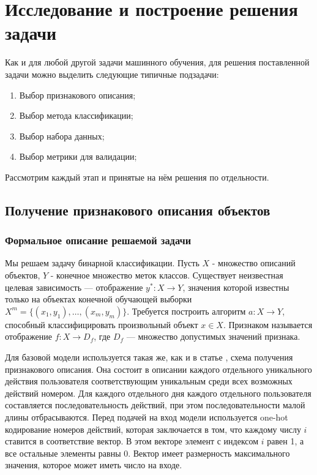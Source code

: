 \chapter{Исследование и построение решения задачи}

Как и для любой другой задачи машинного обучения, для решения поставленной задачи можно выделить следующие типичные подзадачи:\\

\begin{enumerate}
\item Выбор признакового описания; \\
\item Выбор метода классификации;\\
\item Выбор набора данных;\\
\item Выбор метрики для валидации;\\
\end{enumerate}

Рассмотрим каждый этап и принятые на нём решения по отдельности.

\section{Получение признакового описания объектов}

\subsection*{Формальное описание решаемой задачи}

Мы решаем задачу бинарной классификации. Пусть $X$ - множество описаний объектов, $Y$ - конечное множество меток классов. Существует неизвестная целевая зависимость --- отображение $y^*\colon X \rightarrow Y$, значения которой известны только на объектах конечной обучающей выборки $X^m = \{(x_1, y_1),\dots,(x_m, y_m)\}$. Требуется построить алгоритм $a\colon X \rightarrow Y$, способный классифицировать произвольный объект $x \in X$. Признаком называется отображение $f\colon X \rightarrow D_f$, где $D_f$ --- множество допустимых значений признака.

Для базовой модели используется такая же, как и в статье \cite{yuanInsiderThreatDetection2018b}, схема получения признакового описания. Она состоит в описании каждого отдельного уникального действия пользователя соответствующим уникальным среди всех возможных действий номером. Для каждого отдельного дня каждого отдельного пользователя составляется последовательность действий, при этом последовательности малой длины отбрасываются. Перед подачей на вход модели используется one-hot кодирование номеров действий, которая заключается в том, что каждому числу $i$ ставится в соответствие вектор. В этом векторе элемент с индексом $i$ равен 1, а все остальные элементы равны 0. Вектор имеет размерность максимального значения, которое может иметь число на входе.

